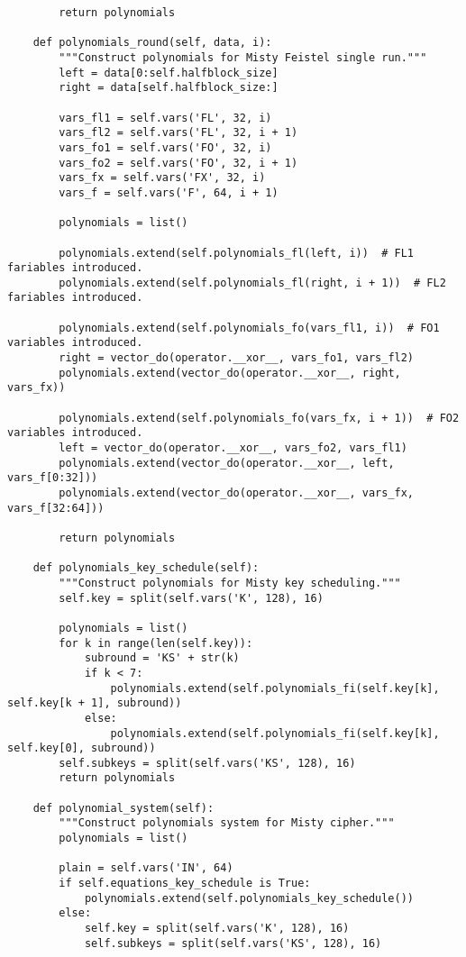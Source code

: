 \begin{lstlisting}
        return polynomials

    def polynomials_round(self, data, i):
        """Construct polynomials for Misty Feistel single run."""
        left = data[0:self.halfblock_size]
        right = data[self.halfblock_size:]

        vars_fl1 = self.vars('FL', 32, i)
        vars_fl2 = self.vars('FL', 32, i + 1)
        vars_fo1 = self.vars('FO', 32, i)
        vars_fo2 = self.vars('FO', 32, i + 1)
        vars_fx = self.vars('FX', 32, i)
        vars_f = self.vars('F', 64, i + 1)

        polynomials = list()

        polynomials.extend(self.polynomials_fl(left, i))  # FL1 fariables introduced.
        polynomials.extend(self.polynomials_fl(right, i + 1))  # FL2 fariables introduced.

        polynomials.extend(self.polynomials_fo(vars_fl1, i))  # FO1 variables introduced.
        right = vector_do(operator.__xor__, vars_fo1, vars_fl2)
        polynomials.extend(vector_do(operator.__xor__, right, vars_fx))

        polynomials.extend(self.polynomials_fo(vars_fx, i + 1))  # FO2 variables introduced.
        left = vector_do(operator.__xor__, vars_fo2, vars_fl1)
        polynomials.extend(vector_do(operator.__xor__, left, vars_f[0:32]))
        polynomials.extend(vector_do(operator.__xor__, vars_fx, vars_f[32:64]))

        return polynomials

    def polynomials_key_schedule(self):
        """Construct polynomials for Misty key scheduling."""
        self.key = split(self.vars('K', 128), 16)

        polynomials = list()
        for k in range(len(self.key)):
            subround = 'KS' + str(k)
            if k < 7:
                polynomials.extend(self.polynomials_fi(self.key[k], self.key[k + 1], subround))
            else:
                polynomials.extend(self.polynomials_fi(self.key[k], self.key[0], subround))
        self.subkeys = split(self.vars('KS', 128), 16)
        return polynomials

    def polynomial_system(self):
        """Construct polynomials system for Misty cipher."""
        polynomials = list()

        plain = self.vars('IN', 64)
        if self.equations_key_schedule is True:
            polynomials.extend(self.polynomials_key_schedule())
        else:
            self.key = split(self.vars('K', 128), 16)
            self.subkeys = split(self.vars('KS', 128), 16)


\end{lstlisting}
